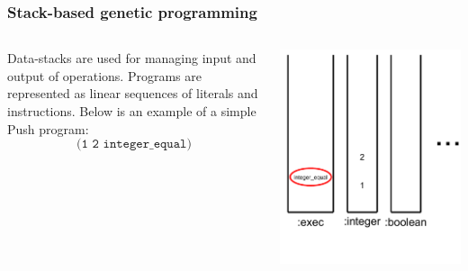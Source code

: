 \documentclass{beamer}
\newcommand{\linespace}{\vskip 0.25cm}
\begin{document}
\begin{frame}
	\frametitle{Stack-based genetic programming}
	\begin{columns}
		\begin{column}{0.6\textwidth}
			Data-stacks are used for managing input and output of operations.
			\linespace
			\linespace
			\linespace
			Programs are represented as linear sequences of literals and instructions. Below is an example of a simple Push program:
			\[\texttt{(1 2 integer\_equal)}\]
		\end{column}
		\begin{column}{0.4\textwidth}
			\includegraphics[height=1.2\textwidth]{Illustrations/stack_5.PDF}
		\end{column}
	\end{columns}
\end{frame}
\end{document}
